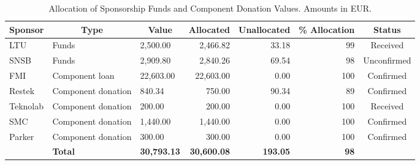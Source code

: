\begin{table}[H]
\centering
\begin{tabular}{l|m{}|l|r|r|r|c}
\hline
\multicolumn{1}{|l|}{\textbf{Sponsor}} & \multicolumn{1}{|c|}{\textbf{Type}} & \multicolumn{1}{c|}{\textbf{Value}} & \multicolumn{1}{c|}{\textbf{Allocated}} & \multicolumn{1}{c|}{\textbf{Unallocated}} & \multicolumn{1}{c|}{\textbf{\% Allocation}} & \multicolumn{1}{c|}{\textbf{Status}} \\ \hline
\multicolumn{1}{|l|}{LTU} & Funds & 2,500.00 & 2,466.82 & 33.18 & 99 & \multicolumn{1}{c|}{Received} \\ \hline
\multicolumn{1}{|l|}{SNSB} & Funds & 2,909.80 & 2,840.26 & 69.54 & 98 & \multicolumn{1}{c|}{Unconfirmed} \\ \hline
\multicolumn{1}{|l|}{FMI} & Component loan & 22,603.00 & 22,603.00 & 0.00 & 100 & \multicolumn{1}{c|}{Confirmed} \\ \hline
\multicolumn{1}{|l|}{Restek} & Component donation & 840.34 & 750.00 & 90.34 & 89 & \multicolumn{1}{c|}{Confirmed} \\ \hline
\multicolumn{1}{|l|}{Teknolab} & Component donation & 200.00 & 200.00 & 0.00 & 100 & \multicolumn{1}{c|}{Received} \\ \hline
\multicolumn{1}{|l|}{SMC} & Component donation & 1,440.00 & 1,440.00 & 0.00 & 100 & \multicolumn{1}{c|}{Confirmed} \\ \hline
\multicolumn{1}{|l|}{Parker} & Component donation & 300.00 & 300.00 & 0.00 & 100 & \multicolumn{1}{c|}{Confirmed} \\ \hline
 & \multicolumn{1}{l|}{\textbf{Total}} & \textbf{30,793.13} & \textbf{30,600.08} & \textbf{193.05} & \textbf{98} & \multicolumn{1}{l}{} \\ \cline{2-6}
\end{tabular}
\caption{Allocation of Sponsorship Funds and Component Donation Values. Amounts in EUR.}
\label{table:sponsroship-allocation}
\end{table}